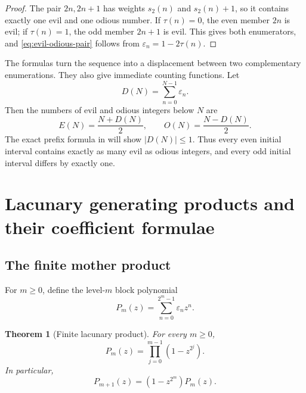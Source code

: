 \documentclass[11pt,oneside]{article}
\newtheorem{theorem}{Theorem}[section]
\theoremstyle{definition}
\theoremstyle{remark}
\newcommand{\wt}{s_2}
\newcommand{\eps}{\varepsilon}
\begin{document}
\begin{proof}
The pair \(2n,2n+1\) has weights \(\wt(n)\) and \(\wt(n)+1\), so it contains exactly one
evil and one odious number.  If \(\tau(n)=0\), the even member \(2n\) is evil; if
\(\tau(n)=1\), the odd member \(2n+1\) is evil.  This gives both enumerators, and
\eqref{eq:evil-odious-pair} follows from \(\eps_n=1-2\tau(n)\).
\end{proof}

The formulas turn the sequence into a displacement between two complementary enumerations.
They also give immediate counting functions.  Let
\begin{equation}
  D(N)=\sum_{n=0}^{N-1}\eps_n.                              \label{eq:prefix-D-preview}
\end{equation}
Then the numbers of evil and odious integers below \(N\) are
\begin{equation}
  E(N)=\frac{N+D(N)}2,
  \qquad
  O(N)=\frac{N-D(N)}2.                                      \label{eq:evil-odious-counts}
\end{equation}
The exact prefix formula in  will show \(|D(N)|\le1\).  Thus every even
initial interval contains exactly as many evil as odious integers, and every odd initial
interval differs by exactly one.

\section{Lacunary generating products and their coefficient formulae}
\label{sec:generating}

\subsection{The finite mother product}

For \(m\ge0\), define the level-\(m\) block polynomial
\begin{equation}
  P_m(z)=\sum_{n=0}^{2^m-1}\eps_nz^n.                       \label{eq:Pm-definition}
\end{equation}

\begin{theorem}[Finite lacunary product]
\label{thm:finite-lacunary-product}
For every \(m\ge0\),
\begin{equation}
  \boxed{
  P_m(z)=\prod_{j=0}^{m-1}(1-z^{2^j}).}                    \label{eq:finite-lacunary-product}
\end{equation}
In particular,
\begin{equation}
  P_{m+1}(z)=(1-z^{2^m})P_m(z).                             \label{eq:Pm-recursion}
\end{equation}
\end{theorem}
\end{document}
